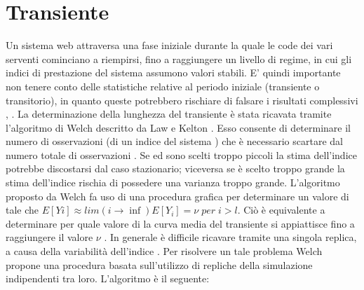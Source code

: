 \section{Transiente}
Un sistema web attraversa una fase iniziale durante la quale le code dei vari serventi cominciano a riempirsi, fino a raggiungere un livello di regime, in cui gli indici di prestazione del sistema assumono valori stabili. E’ quindi importante non tenere conto delle statistiche relative al periodo iniziale (transiente o transitorio), in quanto queste potrebbero rischiare di falsare i risultati complessivi \cite{rif1}, \cite{rif2}. La determinazione della lunghezza del transiente è stata ricavata tramite l’algoritmo di Welch descritto da Law e Kelton \cite{rif4}. Esso consente di determinare il numero di osservazioni  (di un indice del sistema  ) che è necessario scartare dal numero totale di osservazioni . Se  ed  sono scelti troppo piccoli la stima dell’indice potrebbe discostarsi 
dal caso stazionario; viceversa se  è scelto troppo grande la stima dell’indice rischia di possedere una varianza troppo grande. 
L’algoritmo proposto da Welch fa uso di una procedura grafica per determinare un valore di  tale che $E[Yi ] \approx lim(i \rightarrow \inf ) E[Y_{i}] = \nu \;per\; i > l $. Ciò è equivalente a determinare per quale valore di  la curva media del transiente si appiattisce fino a raggiungere il valore $\nu$ . In generale è difficile ricavare  tramite una singola replica, a causa della variabilità dell’indice . Per risolvere un tale problema Welch propone una procedura basata sull’utilizzo di  repliche della simulazione indipendenti tra loro. L'algoritmo è il seguente:

